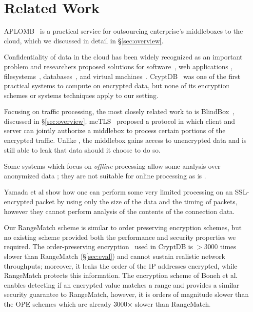 
\section{Related Work}
\label{sec:related}

APLOMB~\cite{aplomb} is a practical service for outsourcing enterprise's middleboxes to the cloud, which we discussed in detail in \S\ref{sec:overview}.

Confidentiality of data in the cloud has been widely recognized as an important problem and researchers proposed solutions for software~\cite{Baumann:Haven}, web applications \cite{giffin:hails, Mylar},  filesystems~\cite{blaze:cfs, kallahalla:plutus, goh:sirius},  databases~\cite{popa:cryptdb},  and virtual machines~\cite{Zhang:CloudVisor}. 
CryptDB~\cite{popa:cryptdb} was one of the first practical systems to compute on encrypted data, but none of its encryption schemes or systems techniques apply to our setting. 

Focusing on traffic processing, the most closely related work to \sys is BlindBox~\cite{blindbox}, discussed in \S\ref{sec:overview}.
mcTLS~\cite{mctls} proposed a protocol in which client and server can jointly authorize a middlebox to process certain portions of the encrypted traffic. Unlike \sys, the middlebox  gains access to unencrypted data and is still able to leak that data should it choose to do so. 

Some systems which focus on {\it offline} processing allow some analysis over anonymized data \cite{Vern:Anonymize06, Vern:Anonymize03}; they are not suitable for online processing as is \sys.

Yamada et al\cite{Yamada_IDS} show how one can perform some very limited processing on an SSL-encrypted packet by using only the size of the data and the timing of packets, however they cannot perform analysis of the contents of the connection data.

Our RangeMatch scheme is similar to order preserving encryption schemes, but no existing scheme provided both the performance and security properties we required.
The order-preserving encryption~\cite{boldyreva:ope, popa:mope} used in CryptDB is 
 $>3000$ times slower than RangeMatch (\S\ref{sec:eval}) and cannot sustain realistic network throughputs; moreover, it leaks the order of the IP addresses encrypted, while RangeMatch protects this information. 
The encryption scheme of Boneh et al.~\cite{BonehRange} enables detecting if an encrypted value matches a range and provides a similar security guarantee to RangeMatch, however, it is orders of magnitude slower than the OPE schemes which are already 3000$\times$ slower than RangeMatch. 

